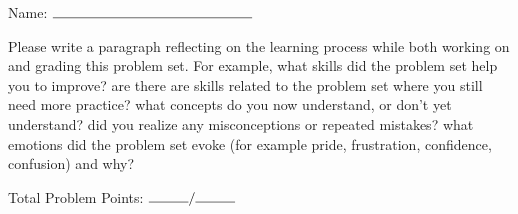 \documentclass[11pt]{article}
\begin{document}

\hfill Name: $\rule{5cm}{.15mm}$



\vspace{1cm}

Please write a paragraph reflecting on the learning process while both working on and grading this problem set. For example, what skills did the problem set help you to improve? are there are skills related to the problem set where you still need more practice? what concepts do you now understand, or don't yet understand? did you realize any misconceptions or repeated mistakes? what emotions did the problem set evoke (for example pride, frustration, confidence, confusion) and why?

\vspace{5cm}
\noindent Total Problem Points: $\rule{1cm}{0.15mm}/\rule{1cm}{0.15mm}$
\end{document}
